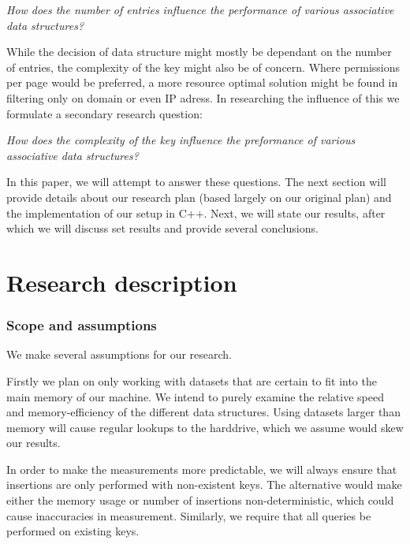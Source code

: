\documentclass[12pt,a4paper]{article}
\begin{document}
    \emph{How does the number of entries influence the performance of various associative data structures?}
    
    While the decision of data structure might mostly be dependant on the number of entries, the complexity
    of the key might also be of concern. Where permissions per page would be preferred, a more
    resource optimal solution might be found in filtering only on domain or even IP adress.
    In researching the influence of this we formulate a secondary research question:
    
    \emph{How does the complexity of the key influence the preformance of various associative data structures?}
    
    In this paper, we will attempt to answer these questions. The next section will provide details
    about our research plan (based largely on our original plan) and the implementation of our setup in C++. 	 
    Next, we will state our results, after which we will discuss set results and provide several conclusions.    
    
    \section{Research description}
    
    \subsubsection*{Scope and assumptions}
    
    We make several assumptions for our research.

	Firstly we plan on only working with datasets that are certain to fit into the main memory of our machine. We intend to 
    purely examine the relative speed and memory-efficiency of the different data structures. Using datasets larger than 
    memory will cause regular lookups to the harddrive, which we assume would skew our results. 
    
    In order to make the measurements more predictable, we will always ensure that insertions are only performed with 
    non-existent keys. The alternative would make either the memory usage or number of insertions non-deterministic, which 
    could cause inaccuracies in measurement. Similarly, we require that all queries be performed on existing keys.
\end{document}
